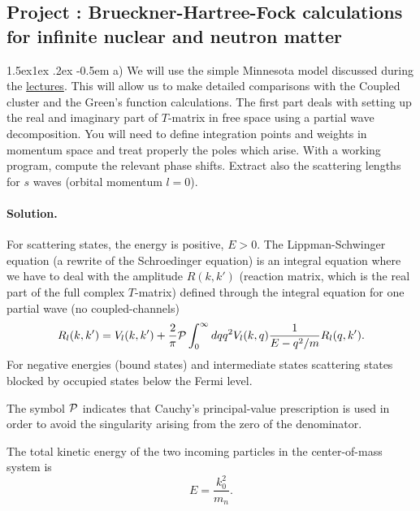 \documentclass[%
twoside,                 %
final,                   %
10pt]{article}
\makeatletter
\newenvironment{doconceexercise}{}{}
\newcounter{doconceexercisecounter}
\newcommand\subex{\@startsection{paragraph}{4}{\z@}%
                  {1.5ex\@plus1ex \@minus.2ex}%
                  {-0.5em}%
                  {\normalfont\normalsize\bfseries}}
\makeatother
\begin{document}
\begin{doconceexercise}

\subsection*{Project \thedoconceexercisecounter: Brueckner-Hartree-Fock calculations for infinite nuclear and neutron matter}



\subex{a)}
We will use  the simple Minnesota model discussed during the \href{{https://github.com/NuclearTalent/Course2ManyBodyMethods/blob/master/doc/pub/cc/pdf/Lectures1-2_TALENT_NuclearMatter_GH.pdf}}{lectures}. This will allow us to make detailed comparisons  with the Coupled cluster and the Green's function calculations. The first part deals with setting up the real and imaginary part of $T$-matrix in free space using a partial wave decomposition. You will need to define integration points and weights in momentum space and treat properly the poles which arise. With a working program, compute the relevant phase shifts. Extract also the scattering lengths for $s$ waves (orbital momentum $l=0$).


\paragraph{Solution.}
For scattering states, the energy is positive, $E>0$. 
The Lippman-Schwinger equation (a rewrite of the Schroedinger equation)
is an integral equation
where we have to deal with the amplitude 
$R(k,k')$ (reaction matrix, which is the real part of  the full
complex $T$-matrix)
defined through the integral equation for one partial wave (no coupled-channels) 
\begin{equation}
    R_l(k,k') = V_l(k,k') +\frac{2}{\pi}{\cal P}
                \int_0^{\infty}dqq^2V_l(k,q)\frac{1}{E-q^2/m}R_l(q,k').
   \label{eq:ls1}
\end{equation}
For negative energies (bound states) and intermediate states scattering states blocked
by  occupied states below the Fermi level.

The symbol ${\cal P}$ indicates that Cauchy's principal-value prescription
is used in order to avoid the singularity arising from the zero of the denominator.


The total kinetic energy of the two 
incoming particles in the center-of-mass system
is 
\[
    E=\frac{k_0^2}{m_n}.
\]


\end{doconceexercise}
\end{document}
